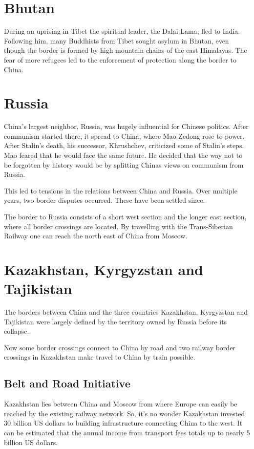 \documentclass[conference]{IEEEtran}
\begin{document}
	\section{Bhutan}
	During an uprising in Tibet the spiritual leader, the Dalai Lama, fled to India\cite{time_howAndWhyTheDalaiLamaLeftTibet}. Following him, many Buddhists from Tibet sought asylum in Bhutan, even though the border is formed by high mountain chains of the east Himalayas. The fear of more refugees led to the enforcement of protection along the border to China.
	
	\section{Russia}
	China's largest neighbor, Russia, was hugely influential for Chinese politics. After communism started there, it spread to China, where Mao Zedong rose to power. After Stalin's death, his successor, Khrushchev, criticized some of Stalin's steps. Mao feared that he would face the same future. He decided that the way not to be forgotten by history would be by splitting Chinas views on communism from Russia.
	
	This led to tensions in the relations between China and Russia. Over multiple years, two border disputes occurred. These have been settled since.
	
	The border to Russia consists of a short west section and the longer east section, where all border crossings are located. By travelling with the Trans-Siberian Railway one can reach the north east of China from Moscow.
	
	\section{Kazakhstan, Kyrgyzstan and Tajikistan}
	The borders between China and the three countries Kazakhstan, Kyrgyzstan and Tajikistan were largely defined by the territory owned by Russia before its collapse.
	
	Now some border crossings connect to China by road and two railway border crossings in Kazakhstan make travel to China by train possible.
	
	\subsection{Belt and Road Initiative}
	Kazakhstan lies between China and Moscow from where Europe can easily be reached by the existing railway network. So, it's no wonder Kazakhstan invested 30 billion US dollars to building infrastructure connecting China to the west. It can be estimated that the annual income from transport fees totals up to nearly 5 billion US dollars.
	
\end{document}
